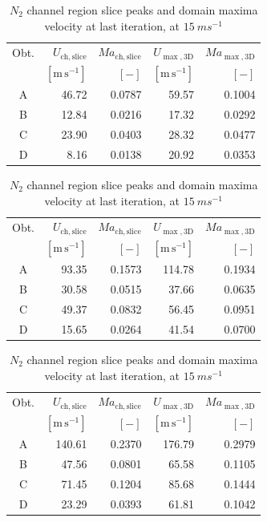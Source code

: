 \begin{table}[htbp]
\centering
\small
\setlength{\tabcolsep}{4pt}
\begin{tabular}{@{}crrrr@{}}
\toprule
 Obt. & $U_{\mathrm{ch,slice}}$ & $Ma_{\mathrm{ch,slice}}$ & $U_{\max,\mathrm{3D}}$ & $Ma_{\max,\mathrm{3D}}$\\
 & $[\mathrm{m\,s^{-1}}]$ & $[-]$ & $[\mathrm{m\,s^{-1}}]$ & $[-]$\\
\midrule
 A & 46.72 & 0.0787 & 59.57 & 0.1004\\
 B & 12.84 & 0.0216 & 17.32 & 0.0292\\
 C & 23.90 & 0.0403 & 28.32 & 0.0477\\
 D & 8.16 & 0.0138 & 20.92 & 0.0353\\
\bottomrule
\end{tabular}
\caption{$N_2$ channel region slice peaks and domain maxima velocity at last iteration, at $5\ ms^{-1}$}
\label{tab:nitrogen_local_mach1}

\vspace{1cm}

\begin{tabular}{@{}crrrr@{}}
\toprule
 Obt. & $U_{\mathrm{ch,slice}}$ & $Ma_{\mathrm{ch,slice}}$ & $U_{\max,\mathrm{3D}}$ & $Ma_{\max,\mathrm{3D}}$\\
  & $[\mathrm{m\,s^{-1}}]$ & $[-]$ & $[\mathrm{m\,s^{-1}}]$ & $[-]$\\
\midrule
 A & 93.35 & 0.1573 & 114.78 & 0.1934\\
 B & 30.58 & 0.0515 & 37.66 & 0.0635\\
 C & 49.37 & 0.0832 & 56.45 & 0.0951\\
 D & 15.65 & 0.0264 & 41.54 & 0.0700\\
\bottomrule
\end{tabular}
\caption{$N_2$ channel region slice peaks and domain maxima velocity at last iteration, at $10\ ms^{-1}$}
\label{tab:nitrogen_local_mach2}

\vspace{1cm}

\begin{tabular}{@{}crrrr@{}}
\toprule
 Obt. & $U_{\mathrm{ch,slice}}$ & $Ma_{\mathrm{ch,slice}}$ & $U_{\max,\mathrm{3D}}$ & $Ma_{\max,\mathrm{3D}}$\\
  & $[\mathrm{m\,s^{-1}}]$ & $[-]$ & $[\mathrm{m\,s^{-1}}]$ & $[-]$\\
\midrule
 A & 140.61 & 0.2370 & 176.79 & 0.2979\\
 B & 47.56 & 0.0801 & 65.58 & 0.1105\\
 C & 71.45 & 0.1204 & 85.68 & 0.1444\\
 D & 23.29 & 0.0393 & 61.81 & 0.1042\\
\bottomrule
\end{tabular}
\caption{$N_2$ channel region slice peaks and domain maxima velocity at last iteration, at $15\ ms^{-1}$}
\label{tab:nitrogen_local_mach3}

\end{table}
\clearpage

